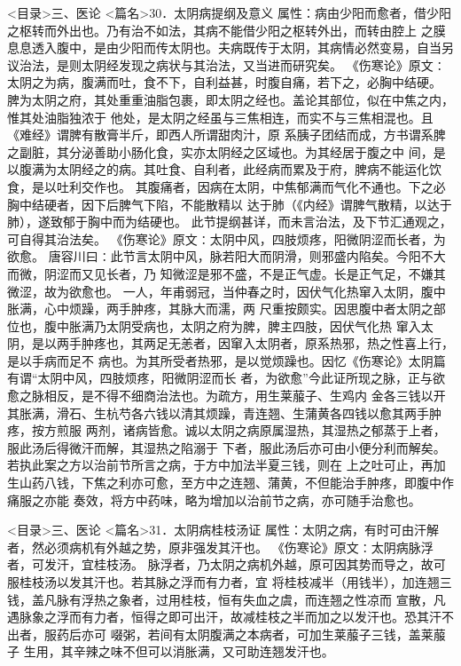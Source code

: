 \documentclass[a4paper,12pt,UTF8,twoside]{ctexbook}
\begin{document}
<目录>三、医论
<篇名>30．太阴病提纲及意义
属性：病由少阳而愈者，借少阳之枢转而外出也。乃有治不如法，其病不能借少阳之枢转外出，而转由腔上 
之膜息息透入腹中，是由少阳而传太阴也。夫病既传于太阴，其病情必然变易，自当另 
议治法，是则太阴经发现之病状与其治法，又当进而研究矣。 
《伤寒论》原文∶太阴之为病，腹满而吐，食不下，自利益甚，时腹自痛，若下之，必胸中结硬。 
脾为太阴之府，其处重重油脂包裹，即太阴之经也。盖论其部位，似在中焦之内，惟其处油脂独浓于 
他处，是太阴之经虽与三焦相连，而实不与三焦相混也。且《难经》谓脾有散膏半斤，即西人所谓甜肉汁，原 
系胰子团结而成，方书谓系脾之副脏，其分泌善助小肠化食，实亦太阴经之区域也。为其经居于腹之中 
间，是以腹满为太阴经之的病。其吐食、自利者，此经病而累及于府，脾病不能运化饮食，是以吐利交作也。 
其腹痛者，因病在太阴，中焦郁满而气化不通也。下之必胸中结硬者，因下后脾气下陷，不能散精以 
达于肺（《内经》谓脾气散精，以达于肺），遂致郁于胸中而为结硬也。 
此节提纲甚详，而未言治法，及下节汇通观之，可自得其治法矣。 
《伤寒论》原文∶太阴中风，四肢烦疼，阳微阴涩而长者，为欲愈。 
唐容川曰∶此节言太阴中风，脉若阳大而阴滑，则邪盛内陷矣。今阳不大而微，阴涩而又见长者，乃 
知微涩是邪不盛，不是正气虚。长是正气足，不嫌其微涩，故为欲愈也。 
一人，年甫弱冠，当仲春之时，因伏气化热窜入太阴，腹中胀满，心中烦躁，两手肿疼，其脉大而濡，两 
尺重按颇实。因思腹中者太阴之部位也，腹中胀满乃太阴受病也，太阴之府为脾，脾主四肢，因伏气化热 
窜入太阴，是以两手肿疼也，其两足无恙者，因窜入太阴者，原系热邪，热之性喜上行，是以手病而足不 
病也。为其所受者热邪，是以觉烦躁也。因忆《伤寒论》太阴篇有谓“太阴中风，四肢烦疼，阳微阴涩而长 
者，为欲愈”今此证所现之脉，正与欲愈之脉相反，是不得不细商治法也。为疏方，用生莱菔子、生鸡内 
金各三钱以开其胀满，滑石、生杭芍各六钱以清其烦躁，青连翘、生蒲黄各四钱以愈其两手肿疼，按方煎服 
两剂，诸病皆愈。诚以太阴之病原属湿热，其湿热之郁蒸于上者，服此汤后得微汗而解，其湿热之陷溺于 
下者，服此汤后亦可由小便分利而解矣。若执此案之方以治前节所言之病，于方中加法半夏三钱，则在 
上之吐可止，再加生山药八钱，下焦之利亦可愈，至方中之连翘、蒲黄，不但能治手肿疼，即腹中作痛服之亦能 
奏效，将方中药味，略为增加以治前节之病，亦可随手治愈也。 

<目录>三、医论
<篇名>31．太阴病桂枝汤证
属性：太阴之病，有时可由汗解者，然必须病机有外越之势，原非强发其汗也。 
《伤寒论》原文∶太阴病脉浮者，可发汗，宜桂枝汤。 
脉浮者，乃太阴之病机外越，原可因其势而导之，故可服桂枝汤以发其汗也。若其脉之浮而有力者，宜 
将桂枝减半（用钱半），加连翘三钱，盖凡脉有浮热之象者，过用桂枝，恒有失血之虞，而连翘之性凉而 
宣散，凡遇脉象之浮而有力者，恒得之即可出汗，故减桂枝之半而加之以发汗也。恐其汗不出者，服药后亦可 
啜粥，若间有太阴腹满之本病者，可加生莱菔子三钱，盖莱菔子 
生用，其辛辣之味不但可以消胀满，又可助连翘发汗也。 
\end{document}
